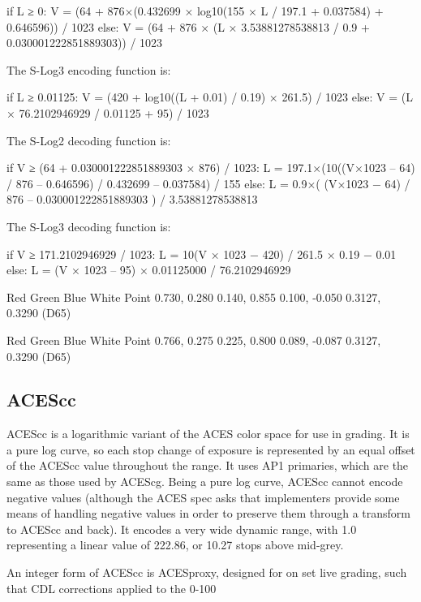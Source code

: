 	if L ≥ 0:
		V = (64 + 876×(0.432699 × log10(155 × L / 197.1 + 0.037584) + 0.646596)) / 1023
	else:
		V = (64 + 876 × (L × 3.53881278538813 / 0.9 + 0.030001222851889303)) / 1023

The S-Log3 encoding function is:

	if L ≥ 0.01125:
		V = (420 + log10((L + 0.01) / 0.19) × 261.5) / 1023
	else:
		V = (L × 76.2102946929 / 0.01125 + 95) / 1023


The S-Log2 decoding function is:

	if V ≥ (64 + 0.030001222851889303 × 876) / 1023:
		L = 197.1×(10((V×1023 – 64) / 876 – 0.646596) / 0.432699  – 0.037584) / 155
	else:
		L = 0.9×( (V×1023 − 64) / 876 – 0.030001222851889303 ) / 3.53881278538813

The S-Log3 decoding function is:

	if V ≥ 171.2102946929 / 1023:
		L = 10(V × 1023 − 420) / 261.5 × 0.19 − 0.01
	else:
		L = (V × 1023 – 95) × 0.01125000 / 76.2102946929



Red
Green
Blue
White Point
0.730, 0.280
0.140, 0.855
0.100, -0.050
0.3127, 0.3290 (D65)


Red
Green
Blue
White Point
0.766, 0.275
0.225, 0.800
0.089, -0.087
0.3127, 0.3290 (D65)

\subsection{ACEScc}
\label{subsec:acescc}

ACEScc is a logarithmic variant of the ACES color space for use in grading. It is a pure log curve, so each stop change of exposure is represented by an equal offset of the ACEScc value throughout the range. It uses AP1 primaries, which are the same as those used by ACEScg. Being a pure log curve, ACEScc cannot encode negative values (although the ACES spec asks that implementers provide some means of handling negative values in order to preserve them through a transform to ACEScc and back). It encodes a very wide dynamic range, with 1.0 representing a linear value of 222.86, or 10.27 stops above mid-grey.

An integer form of ACEScc is ACESproxy, designed for on set live grading, such that CDL corrections applied to the 0-100%

